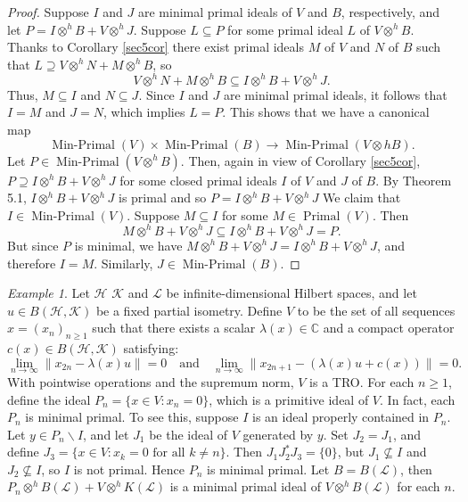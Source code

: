 \documentclass{birkjour}
\theoremstyle{definition}
\theoremstyle{remark}
\newtheorem*{ex}{Example}
\numberwithin{equation}{section}
\renewcommand{\setminus}{\smallsetminus}
\begin{document}
\begin{proof}
    Suppose $I$ and $J$ are minimal  primal ideals of $V$ and $B$, respectively, and let $P = I \otimes^h B + V \otimes^h J$. Suppose $L \subseteq P$ for some primal ideal $L$ of $V \otimes^h B$. Thanks to Corollary \ref{sec5cor} there exist primal ideals $M$ of $V$ and $N$ of $B$ such that $L \supseteq V \otimes^h N + M \otimes^h B$, so 
\[
V \otimes^h N + M \otimes^h B \subseteq I \otimes^h B + V \otimes^h J.
\]
Thus, $M \subseteq I$ and $N \subseteq J$. Since $I$ and $J$ are minimal primal ideals, it follows that $I = M$ and $J = N$, which implies $L = P$. This shows that we have a canonical map \[ \operatorname{Min-Primal} (V) \times \operatorname{Min-Primal} (B) \to \operatorname{Min-Primal} (V \otimes h B).
\]
Let $P \in \operatorname{Min-Primal}(V \otimes^h B)$. Then, again in view of Corollary \ref{sec5cor}, $P \supseteq I \otimes^h B + V \otimes^h J$ for some closed primal ideals $I$ of $V$ and $J$ of $B$. By Theorem 5.1, $I \otimes^h B + V \otimes^h J$ is primal and so $P=I \otimes^h B + V \otimes^h J$  We claim that $I \in \operatorname{Min-Primal}(V)$. Suppose $M \subseteq I$ for some $M \in \operatorname{Primal}(V)$. Then 
\[
M \otimes^h B + V \otimes^h J \subseteq I \otimes^h B + V \otimes^h J = P.
\]
But since $P$ is minimal, we have $M \otimes^h B + V \otimes^h J = I \otimes^h B + V \otimes^h J$, and therefore $I = M$. Similarly, $J \in \operatorname{Min-Primal}(B)$. 
\end{proof}

    \begin{ex}
    Let \( \mathcal{H} \)  \( \mathcal{K} \) and \(\mathcal{L} \) be infinite-dimensional Hilbert spaces, and let \( u \in B(\mathcal{H}, \mathcal{K}) \) be a fixed partial isometry. Define \( V  \) to be the set of all sequences \( x = (x_n)_{n \geq 1} \) such that there exists a scalar \( \lambda(x) \in \mathbb{C} \) and a compact operator \( c(x) \in B(\mathcal{H}, \mathcal{K}) \) satisfying:
\[
\lim_{n \to \infty} \|x_{2n} - \lambda(x) u\| = 0 \quad \text{and} \quad \lim_{n \to \infty} \|x_{2n+1} - (\lambda(x) u + c(x))\| = 0.
\]
 With pointwise operations and the supremum norm, \( V \) is a TRO. For each \( n \geq 1 \), define the ideal $P_n = \{ x \in V : x_n = 0 \}$, which is a primitive ideal of \( V \). In fact, each \( P_n \) is minimal primal. To see this, suppose \( I \) is an ideal properly contained in \( P_n \). Let \( y \in P_n \setminus I \), and let \( J_1 \) be the ideal of \( V \) generated by \( y \). Set \( J_2 = J_1 \), and define $J_3 = \{ x \in V : x_k = 0 \text{ for all } k \ne n \}$. Then \( J_1 J_2^*J_3 = \{0\} \), but \( J_1 \not\subseteq I \) and \( J_2 \not\subseteq I \), so \( I \) is not primal. Hence \( P_n \) is minimal primal. Let $B= B(\mathcal{L})$, then $P_n \otimes^h B(\mathcal{L})+ V \otimes^h K(\mathcal{L}) $ is a minimal primal ideal of $V \otimes^h B(\mathcal{L})$ for each $n$. 
\end{ex}
\end{document}
